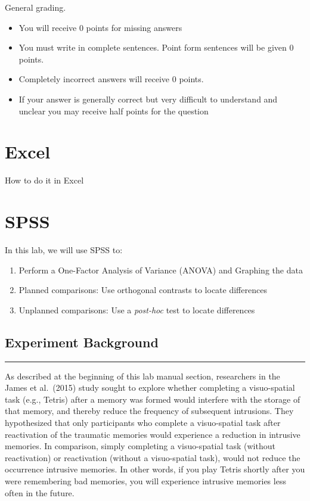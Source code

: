 \documentclass[
]{book}
\providecommand{\tightlist}{%
  \setlength{\itemsep}{0pt}\setlength{\parskip}{0pt}}
\begin{document}
General grading.

\begin{itemize}
\tightlist
\item
  You will receive 0 points for missing answers
\item
  You must write in complete sentences. Point form sentences will be given 0 points.
\item
  Completely incorrect answers will receive 0 points.
\item
  If your answer is generally correct but very difficult to understand and unclear you may receive half points for the question
\end{itemize}

\hypertarget{excel-7}{%
\section{Excel}\label{excel-7}}

How to do it in Excel

\hypertarget{spss-7}{%
\section{SPSS}\label{spss-7}}

In this lab, we will use SPSS to:

\begin{enumerate}
\def\labelenumi{\arabic{enumi}.}
\tightlist
\item
  Perform a One-Factor Analysis of Variance (ANOVA) and Graphing the data
\item
  Planned comparisons: Use orthogonal contrasts to locate differences
\item
  Unplanned comparisons: Use a \emph{post-hoc} test to locate differences
\end{enumerate}

\hypertarget{experiment-background-3}{%
\subsection{Experiment Background}\label{experiment-background-3}}

\begin{center}\rule{0.5\linewidth}{0.5pt}\end{center}

As described at the beginning of this lab manual section, researchers in the James et al.~(2015) study sought to explore whether completing a visuo-spatial task (e.g., Tetris) after a memory was formed would interfere with the storage of that memory, and thereby reduce the frequency of subsequent intrusions. They hypothesized that only participants who complete a visuo-spatial task after reactivation of the traumatic memories would experience a reduction in intrusive memories. In comparison, simply completing a visuo-spatial task (without reactivation) or reactivation (without a visuo-spatial task), would not reduce the occurrence intrusive memories. In other words, if you play Tetris shortly after you were remembering bad memories, you will experience intrusive memories less often in the future.
\end{document}
